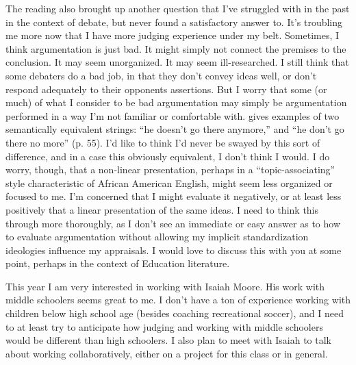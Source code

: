 \documentclass[man,12pt,natbib]{apa6}
\begin{document}
The reading also brought up another question that I've struggled with in the
past in the context of debate, but never found a satisfactory answer to. It's
troubling me more now that I have more judging experience under my belt.
Sometimes, I think argumentation is just bad. It might simply not connect the
premises to the conclusion. It may seem unorganized. It may seem
ill-researched. I still think that some debaters do a bad job, in that they
don't convey ideas well, or don't respond adequately to their opponents
assertions. But I worry that some (or much) of what I consider to be bad
argumentation may simply be argumentation performed in a way I'm not familiar
or comfortable with. 
\citet{Lippi-Green11} gives examples of two semantically equivalent strings:
``he doesn't go there anymore,'' and ``he don't go there no more'' (p. 55).
I'd like to think I'd never be swayed by this sort of difference, and in a case
this obviously equivalent, I don't think I would. I do worry, though, that a
non-linear presentation, perhaps in a ``topic-associating''
\citep[p.~102]{CharityHudley10} style characteristic of African American
English, might seem less organized or focused to me. I'm concerned that I might
evaluate it negatively, or at least less positively that a linear presentation
of the same ideas. 
I need to think this through more thoroughly, as I don't see an immediate or
easy answer as to how to evaluate argumentation without allowing my implicit
standardization ideologies influence my appraisals. I would love to discuss
this with you at some point, perhaps in the context of Education literature. 

This year I am very interested in working with Isaiah Moore. His work with
middle schoolers seems great to me. 
I don't have a ton of experience working with children below high school age
(besides coaching recreational soccer), and I need to at least try to
anticipate how judging and working with middle schoolers would be different
than high schoolers. I also plan to meet with Isaiah to talk about working
collaboratively, either on a project for this class or in general. 

\clearpage

\end{document}
